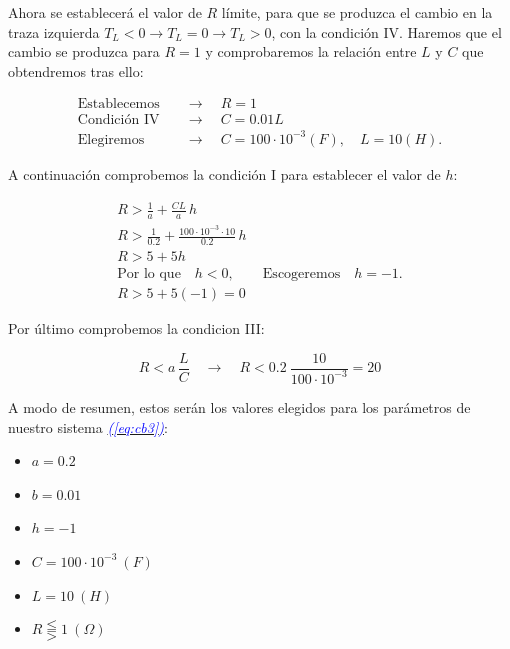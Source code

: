 \documentclass[12pt,a4paper]{report} %
\newcommand{\eref}[1]{\hyperref[#1]{\textcolor{blue}{\textit{(\ref*{#1})}}}}
\begin{document}
	\vspace{0.5cm}\noindent Ahora se establecerá el valor de $R$ límite, para que se produzca el cambio en la traza izquierda $T_L<0 \rightarrow T_L=0 \rightarrow T_L>0$, con la condición IV. Haremos que el cambio se produzca para $R=1$ y comprobaremos la relación entre $L$ y $C$ que obtendremos tras ello:
	
	\begin{equation*}
		\begin{aligned}
			\text{Establecemos} \quad &\longrightarrow \quad R=1 \\[2mm]
			\text{Condición IV} \quad &\longrightarrow \quad C=0.01L\\[2mm]
			\text{Elegiremos} \quad &\longrightarrow \quad C=100\cdot10^{-3}(F), \quad L=10(H).
		\end{aligned}
	\end{equation*}\smallskip
	
	\vspace{0.5cm}\noindent A continuación comprobemos la condición I para establecer el valor de $h$:
	
	\begin{equation*}
	\begin{gathered}
		R>\frac{1}{a}+\frac{CL}{a}\, h\\[3mm] R>\frac{1}{0.2}+\frac{100\cdot10^{-3}\cdot10}{0.2}\, h \\[3mm]
		R>5+5h \\[3mm]
		\text{Por lo que}\quad h<0, \qquad \text{Escogeremos}\quad h=-1.\\[3mm]
		R>5+5(-1)=0
	\end{gathered}
	\end{equation*}\smallskip
	
	\vspace{0.5cm}\noindent Por último comprobemos la condicion III:
	
	\begin{equation*}
		R<a \, \frac{L}{C} \quad \longrightarrow \quad R<0.2\:\frac{10}{100\cdot10^{-3}}=20
	\end{equation*}
	
	\newpage
	
	A modo de resumen, estos serán los valores elegidos para los parámetros de nuestro sistema \eref{eq:cb3}:
	
	\begin{itemize}
		\label{condiconesh}
		\item $a=0.2$
		\item $b=0.01$
		\item $h=-1$
		\item $C=100\cdot10^{-3}\:(F)$
		\item $L=10\:(H)$
		\item $R\lesseqqgtr1\:(\Omega)$
	\end{itemize}
	
\end{document}
